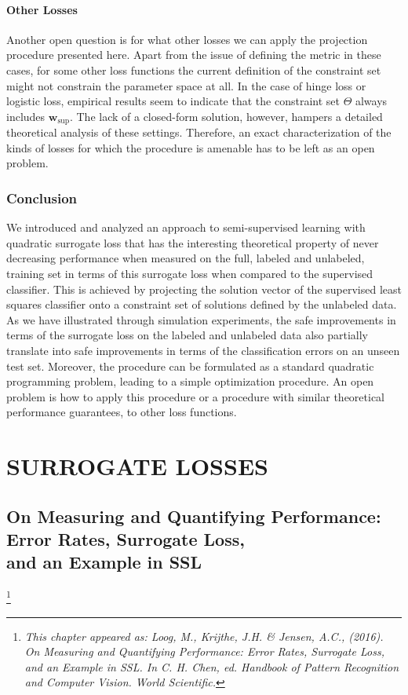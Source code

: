 \documentclass[twoside]{memoir}\usepackage[]{graphicx}\usepackage{xcolor}
\newcommand\blfootnote[1]{%
  \begingroup
  \renewcommand\thefootnote{}\footnote{\itshape#1}%
  \addtocounter{footnote}{-1}%
  \endgroup
}
\newcommand{\mypartpic}{cover/part2.pdf}
\newcommand\PartPic{
\checkoddpage
\ifoddpage
\put(\LenToUnit{-1mm},\LenToUnit{0mm}){
\texttt{[image: \\mypartpic]}
}
\fi
}
\begin{document}
\subsection{Other Losses}
Another open question is for what other losses we can apply the projection procedure presented here. Apart from the issue of defining the metric in these cases, for some other loss functions the current definition of the constraint set might not constrain the parameter space at all. In the case of hinge loss or logistic loss, empirical results seem to indicate that the constraint set $\Theta$ always includes $\mathbf{w}_\mathrm{sup}$.  The lack of a closed-form solution, however, hampers a detailed theoretical analysis of these settings. Therefore, an exact characterization of the kinds of losses for which the procedure is amenable has to be left as an open problem.

\section{Conclusion}
We introduced and analyzed an approach to semi-supervised learning with quadratic surrogate loss that has the interesting theoretical property of never decreasing performance when measured on the full, labeled and unlabeled, training set in terms of this surrogate loss when compared to the supervised classifier. This is achieved by projecting the solution vector of the supervised least squares classifier onto a constraint set of solutions defined by the unlabeled data. As we have illustrated through simulation experiments, the safe improvements in terms of the surrogate loss on the labeled and unlabeled data also partially translate into safe improvements in terms of the classification errors on an unseen test set. Moreover, the procedure can be formulated as a standard quadratic programming problem, leading to a simple optimization procedure. An open problem is how to apply this procedure or a procedure with similar theoretical performance guarantees, to other loss functions.
\cleartoverso
\null
\thispagestyle{empty}
\afterpage{\restorepagecolor}
\newpage
\renewcommand{\mypartpic}{cover/part2.pdf}
\AddToShipoutPicture{\PartPic}
\part{SURROGATE LOSSES}
\ClearShipoutPicture

\chapter[On Measuring and Quantifying Performance]{On Measuring and Quantifying Performance: Error Rates, Surrogate Loss,\\and an Example in SSL}
\label{chapter:quantifying}
\blfootnote{This chapter appeared as: Loog, M., Krijthe, J.H. \& Jensen, A.C., (2016). On Measuring and Quantifying Performance: Error Rates, Surrogate Loss, and an Example in SSL. In C. H. Chen, ed. Handbook of Pattern Recognition and Computer Vision. World Scientific.}
\end{document}
